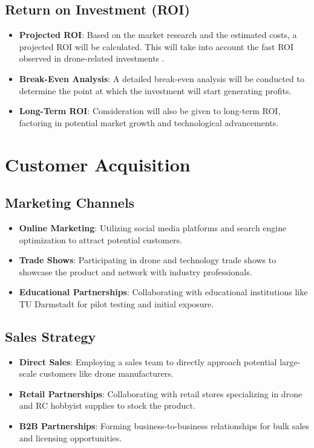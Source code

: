 \documentclass[12pt]{article}
\begin{document}
		\subsection{Return on Investment (ROI)}
			\begin{itemize}
				\item \textbf{Projected ROI}: Based on the market research and the estimated costs, a projected ROI will be calculated. This will take into account the fast ROI observed in drone-related investments \cite{roi-report}.
				\item \textbf{Break-Even Analysis}: A detailed break-even analysis will be conducted to determine the point at which the investment will start generating profits.
				\item \textbf{Long-Term ROI}: Consideration will also be given to long-term ROI, factoring in potential market growth and technological advancements.
			\end{itemize}
		
	
	\section{Customer Acquisition}
		\subsection{Marketing Channels}
			\begin{itemize}
				\item \textbf{Online Marketing}: Utilizing social media platforms and search engine optimization to attract potential customers.
				\item \textbf{Trade Shows}: Participating in drone and technology trade shows to showcase the product and network with industry professionals.
				\item \textbf{Educational Partnerships}: Collaborating with educational institutions like TU Darmstadt for pilot testing and initial exposure.
			\end{itemize}
	
		\subsection{Sales Strategy}
			\begin{itemize}
				\item \textbf{Direct Sales}: Employing a sales team to directly approach potential large-scale customers like drone manufacturers.
				\item \textbf{Retail Partnerships}: Collaborating with retail stores specializing in drone and RC hobbyist supplies to stock the product.
				\item \textbf{B2B Partnerships}: Forming business-to-business relationships for bulk sales and licensing opportunities.
			\end{itemize}
	
\end{document}
